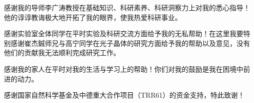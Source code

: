 
\begin{ack}
  感谢我的导师李广涛教授在基础知识、科研素养、科研洞察力上对我的悉心指导！他的谆谆教诲极大地开拓了我的眼界，使我热爱科研事业。
    
  感谢实验室全体同学在平时实验及科研交流方面给予我的无私帮助！在这里我要特别感谢崔杰鋮师兄与高宁同学在光子晶体的研究方面给予我的帮助以及意见，没有他们的贡献我无法顺利完成研究工作。
    
  感谢我的家人在平时对我的生活与学习上的帮助！你们对我的鼓励是我在困境中前进的动力。
    
  感谢国家自然科学基金及中德重大合作项目（TRR61）的资金支持，特此致谢！
\end{ack}
